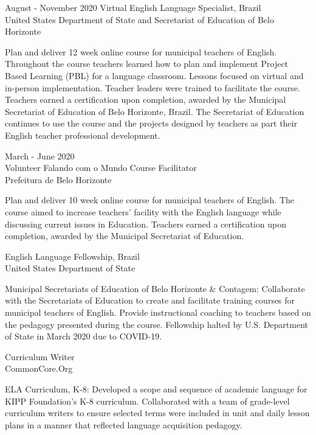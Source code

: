 \documentclass[]{scrartcl}
\begin{document}
\begin{cleanCV}
\WorkExperience
{August - November 2020}
{Virtual English Language Specialist, Brazil\\}
{United States Department of State and Secretariat of Education of Belo Horizonte}

\JobDesc{}
{Plan and deliver 12 week online course for municipal teachers of English. Throughout the course teachers learned how to plan and implement Project Based Learning (PBL) for a language classroom. Lessons focused on virtual and in-person implementation. Teacher leaders were trained to facilitate the course. Teachers earned a certification upon completion, awarded by the Municipal Secretariat of Education of Belo Horizonte, Brazil. The Secretariat of Education continues to use the course and the projects designed by teachers as part their English teacher professional development.}

\pagebreak

\WorkExperience
{March - June 2020 \\ Volunteer}
{Falando com o Mundo Course Facilitator}
{\\Prefeitura de Belo Horizonte}

\JobDesc{}
{Plan and deliver 10 week online course for municipal teachers of English. The course aimed to increase teachers' facility with the English language while discussing current issues in Education. Teachers earned a certification upon completion, awarded by the Municipal Secretariat of Education.}

{English Language Fellowship, Brazil}
{\\United States Department of State}

\JobDesc
{Municipal Secretariats of Education of Belo Horizonte \& Contagem: }
{Collaborate with the Secretariats of Education to create and facilitate training courses for municipal teachers of English. Provide instructional coaching to teachers based on the pedagogy presented during the course. Fellowship halted by U.S. Department of State in March 2020 due to COVID-19.}

{Curriculum Writer}
{\\CommonCore.Org}

\JobDesc
{ELA Curriculum, K-8: }
{Developed a scope and sequence of academic language for KIPP Foundation's K-8 curriculum. Collaborated with a team of grade-level curriculum writers to ensure selected terms were included in unit and daily lesson plans in a manner that reflected language acquisition pedagogy.}


\end{cleanCV}
\end{document}
